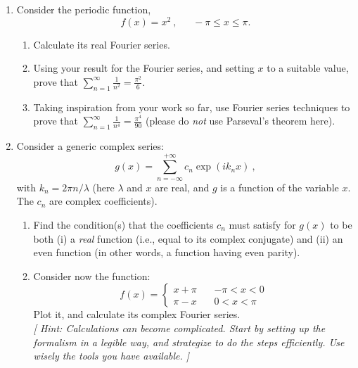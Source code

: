 \documentclass[fleqn]{article}
\begin{document}
\begin{enumerate}

  \item Consider the periodic function, 
  \begin{equation}
  f(x)=x^2~,~~~~~~~ -\pi \leq x \leq \pi. 
  \end{equation}
    \begin{enumerate}
    \item Calculate its real Fourier series.\\
  
    \item Using your result for the Fourier series, and setting $x$ to a suitable value, prove that $\sum^{\infty}_{n=1}\frac{1}{n^2}=\frac{\pi^2}{6}$. 
  
    \item Taking inspiration from your work so far, use Fourier series techniques to prove that $\sum^{\infty}_{n=1}\frac{1}{n^4}=\frac{\pi^4}{90}$ (please do \emph{not} use Parseval's theorem here). 
  
    \end{enumerate}
  
  \item Consider a generic complex series: $$g(x)=\sum_{n=-\infty}^{+ \infty} c_n \exp({ i k_n x})~,$$ with $k_n=2 \pi n/\lambda$ (here $\lambda$ and $x$ are real, and $g$ is a function of the variable $x$. The $c_n$ are complex coefficients).
  
    \begin{enumerate}
  
    \item Find the condition(s) that the coefficients $c_n$ must satisfy for $g(x)$ to be both (i)  a {\it real} function (i.e., equal to its complex conjugate) and (ii) an even function (in other words, a function having even parity).  
  
    \item Consider now the function:
    \begin{equation}
    f\left( x\right) =\left\{ 
    \begin{array}{rrr}
    x+ \pi  & \, & - \pi <x<0 \\ 
    \pi - x & \, & 0<x< \pi
    \end{array}
    \right. 
    \end{equation}
    Plot it, and calculate its complex Fourier series.  \\
    {\it [ Hint: Calculations can become complicated. Start by setting up the formalism in a legible way, and strategize to do the steps efficiently. Use wisely the tools you have available.  ] }
  

\end{enumerate}
\end{enumerate}
\end{document}
